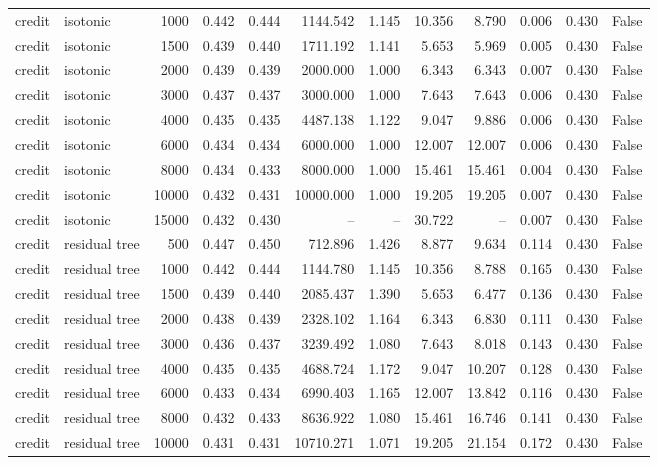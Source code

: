 \begin{tabular}{llrrrrrrrrrr}
credit & isotonic & 1000 & 0.442 & 0.444 & 1144.542 & 1.145 & 10.356 & 8.790 & 0.006 & 0.430 & False \\
credit & isotonic & 1500 & 0.439 & 0.440 & 1711.192 & 1.141 & 5.653 & 5.969 & 0.005 & 0.430 & False \\
credit & isotonic & 2000 & 0.439 & 0.439 & 2000.000 & 1.000 & 6.343 & 6.343 & 0.007 & 0.430 & False \\
credit & isotonic & 3000 & 0.437 & 0.437 & 3000.000 & 1.000 & 7.643 & 7.643 & 0.006 & 0.430 & False \\
credit & isotonic & 4000 & 0.435 & 0.435 & 4487.138 & 1.122 & 9.047 & 9.886 & 0.006 & 0.430 & False \\
credit & isotonic & 6000 & 0.434 & 0.434 & 6000.000 & 1.000 & 12.007 & 12.007 & 0.006 & 0.430 & False \\
credit & isotonic & 8000 & 0.434 & 0.433 & 8000.000 & 1.000 & 15.461 & 15.461 & 0.004 & 0.430 & False \\
credit & isotonic & 10000 & 0.432 & 0.431 & 10000.000 & 1.000 & 19.205 & 19.205 & 0.007 & 0.430 & False \\
credit & isotonic & 15000 & 0.432 & 0.430 & -- & -- & 30.722 & -- & 0.007 & 0.430 & False \\
credit & residual tree & 500 & 0.447 & 0.450 & 712.896 & 1.426 & 8.877 & 9.634 & 0.114 & 0.430 & False \\
credit & residual tree & 1000 & 0.442 & 0.444 & 1144.780 & 1.145 & 10.356 & 8.788 & 0.165 & 0.430 & False \\
credit & residual tree & 1500 & 0.439 & 0.440 & 2085.437 & 1.390 & 5.653 & 6.477 & 0.136 & 0.430 & False \\
credit & residual tree & 2000 & 0.438 & 0.439 & 2328.102 & 1.164 & 6.343 & 6.830 & 0.111 & 0.430 & False \\
credit & residual tree & 3000 & 0.436 & 0.437 & 3239.492 & 1.080 & 7.643 & 8.018 & 0.143 & 0.430 & False \\
credit & residual tree & 4000 & 0.435 & 0.435 & 4688.724 & 1.172 & 9.047 & 10.207 & 0.128 & 0.430 & False \\
credit & residual tree & 6000 & 0.433 & 0.434 & 6990.403 & 1.165 & 12.007 & 13.842 & 0.116 & 0.430 & False \\
credit & residual tree & 8000 & 0.432 & 0.433 & 8636.922 & 1.080 & 15.461 & 16.746 & 0.141 & 0.430 & False \\
credit & residual tree & 10000 & 0.431 & 0.431 & 10710.271 & 1.071 & 19.205 & 21.154 & 0.172 & 0.430 & False \\

\end{tabular}
